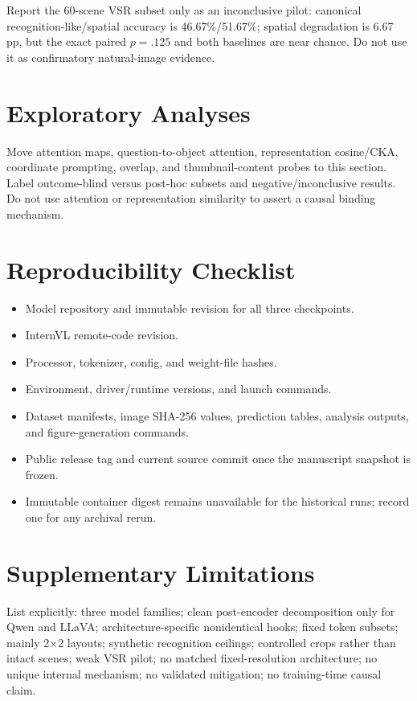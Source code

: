 \documentclass[10pt,twocolumn,letterpaper]{article}
\begin{document}
Report the 60-scene VSR subset only as an inconclusive pilot: canonical recognition-like/spatial accuracy is 46.67\%/51.67\%; spatial degradation is 6.67 pp, but the exact paired $p=.125$ and both baselines are near chance.
Do not use it as confirmatory natural-image evidence.

\section{Exploratory Analyses}

Move attention maps, question-to-object attention, representation cosine/CKA, coordinate prompting, overlap, and thumbnail-content probes to this section.
Label outcome-blind versus post-hoc subsets and negative/inconclusive results.
Do not use attention or representation similarity to assert a causal binding mechanism.

\section{Reproducibility Checklist}

\begin{itemize}[leftmargin=*]
    \item Model repository and immutable revision for all three checkpoints.
    \item InternVL remote-code revision.
    \item Processor, tokenizer, config, and weight-file hashes.
    \item Environment, driver/runtime versions, and launch commands.
    \item Dataset manifests, image SHA-256 values, prediction tables, analysis outputs, and figure-generation commands.
    \item Public release tag and current source commit once the manuscript snapshot is frozen.
    \item Immutable container digest remains unavailable for the historical runs; record one for any archival rerun.
\end{itemize}

\section{Supplementary Limitations}

List explicitly: three model families; clean post-encoder decomposition only for Qwen and LLaVA; architecture-specific nonidentical hooks; fixed token subsets; mainly 2$\times$2 layouts; synthetic recognition ceilings; controlled crops rather than intact scenes; weak VSR pilot; no matched fixed-resolution architecture; no unique internal mechanism; no validated mitigation; no training-time causal claim.
\end{document}
